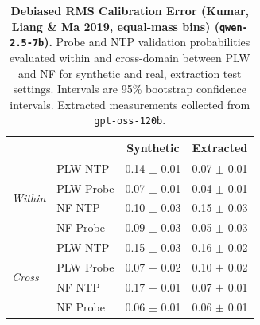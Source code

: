 \begin{table}[ht]
\centering
\begin{tabular}{ll cc}
\toprule
& & Synthetic & Extracted \\
\midrule
\multirow{4}{*}{\textit{Within}}
& PLW NTP & 0.14 $\pm$ 0.01 & 0.07 $\pm$ 0.01 \\
& PLW Probe & 0.07 $\pm$ 0.01 & 0.04 $\pm$ 0.01 \\
& NF NTP & 0.10 $\pm$ 0.03 & 0.15 $\pm$ 0.03 \\
& NF Probe & 0.09 $\pm$ 0.03 & 0.05 $\pm$ 0.03 \\
\midrule
\multirow{4}{*}{\textit{Cross}}
& PLW NTP & 0.15 $\pm$ 0.03 & 0.16 $\pm$ 0.02 \\
& PLW Probe & 0.07 $\pm$ 0.02 & 0.10 $\pm$ 0.02 \\
& NF NTP & 0.17 $\pm$ 0.01 & 0.07 $\pm$ 0.01 \\
& NF Probe & 0.06 $\pm$ 0.01 & 0.06 $\pm$ 0.01 \\
\bottomrule
\end{tabular}
\caption{\textbf{Debiased RMS Calibration Error (Kumar, Liang \& Ma 2019, equal-mass bins) (\texttt{qwen-2.5-7b}).} Probe and NTP validation probabilities evaluated within and cross-domain between PLW and NF for synthetic and real, extraction test settings. Intervals are 95\% bootstrap confidence intervals. Extracted measurements collected from \texttt{gpt-oss-120b}.}
\label{tab:qwen-2.5-7b-gpt-oss-120b-pond_nfix-rmsce_db}
\end{table}
